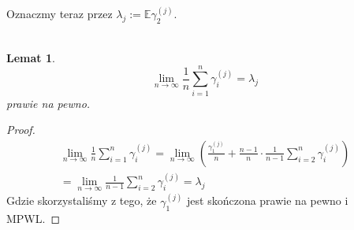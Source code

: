 \documentclass[a4paper]{article}
\theoremstyle{defn}
\theoremstyle{theorem}
\theoremstyle{lemma}
\newtheorem{lemma}[defn]{Lemat}
\theoremstyle{cor}
\theoremstyle{fact}
\begin{document}
Oznaczmy teraz przez $\lambda_j := \mathbb{E}\gamma_2^{(j)}$.\\\\
\begin{lemma}\label{lemma2.5.11}
$$\lim\limits_{n \to \infty} \frac{1}{n} \sum\limits_{i = 1}^n \gamma_i^{(j)} = \lambda_j$$
prawie na pewno.
\end{lemma}
\begin{proof}
\begin{align*}
    \lim\limits_{n \to \infty} \frac{1}{n} \sum\limits_{i = 1}^n \gamma_i^{(j)} =
    \lim\limits_{n \to \infty} \left(\frac{\gamma_1^{(j)}}{n} + \frac{n-1}{n}\cdot\frac{1}{n-1} \sum\limits_{i = 2}^n \gamma_i^{(j)}\right)\\
    = \lim\limits_{n \to \infty} \frac{1}{n-1} \sum\limits_{i = 2}^n \gamma_i^{(j)} = \lambda_j
\end{align*}
Gdzie skorzystaliśmy z tego, że $\gamma_1^{(j)}$ jest skończona prawie na pewno i MPWL.
\end{proof}
\end{document}

